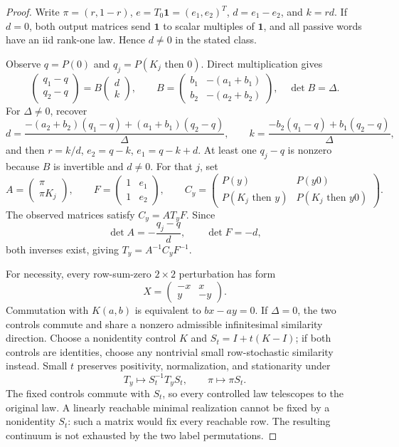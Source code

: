 \documentclass[11pt,letterpaper]{article}
\newcommand{\one}{\mathbf1}
\begin{document}
\begin{proof}
Write $\pi=(r,1-r)$, $e=T_0\one=(e_1,e_2)^T$, $d=e_1-e_2$, and $k=rd$. If $d=0$, both output matrices send $\one$ to scalar multiples of $\one$, and all passive words have an iid rank-one law. Hence $d\ne0$ in the stated class.

Observe $q=P(0)$ and $q_j=P(K_j\text{ then }0)$. Direct multiplication gives
\begin{equation}
 \begin{pmatrix}q_1-q\\q_2-q\end{pmatrix}
 =B\begin{pmatrix}d\\k\end{pmatrix},\qquad
 B=\begin{pmatrix}b_1&-(a_1+b_1)\\b_2&-(a_2+b_2)\end{pmatrix},
 \quad \det B=\Delta. \label{eq:B}
\end{equation}
For $\Delta\ne0$, recover
\[
 d=\frac{-(a_2+b_2)(q_1-q)+(a_1+b_1)(q_2-q)}{\Delta},\qquad
 k=\frac{-b_2(q_1-q)+b_1(q_2-q)}{\Delta},
\]
and then $r=k/d$, $e_2=q-k$, $e_1=q-k+d$. At least one $q_j-q$ is nonzero because $B$ is invertible and $d\ne0$. For that $j$, set
\[
 A=\begin{pmatrix}\pi\\\pi K_j\end{pmatrix},\qquad
 F=\begin{pmatrix}1&e_1\\1&e_2\end{pmatrix},\qquad
 C_y=\begin{pmatrix}P(y)&P(y0)\\P(K_j\text{ then }y)&P(K_j\text{ then }y0)\end{pmatrix}.
\]
The observed matrices satisfy $C_y=AT_yF$. Since
\[
 \det A=-\frac{q_j-q}{d},\qquad\det F=-d,
\]
both inverses exist, giving $T_y=A^{-1}C_yF^{-1}$.

For necessity, every row-sum-zero $2\times2$ perturbation has form
\[
 X=\begin{pmatrix}-x&x\\y&-y\end{pmatrix}.
\]
Commutation with $K(a,b)$ is equivalent to $bx-ay=0$. If $\Delta=0$, the two controls commute and share a nonzero admissible infinitesimal similarity direction. Choose a nonidentity control $K$ and $S_t=I+t(K-I)$; if both controls are identities, choose any nontrivial small row-stochastic similarity instead. Small $t$ preserves positivity, normalization, and stationarity under
\[
 T_y\mapsto S_t^{-1}T_yS_t,\qquad\pi\mapsto\pi S_t.
\]
The fixed controls commute with $S_t$, so every controlled law telescopes to the original law. A linearly reachable minimal realization cannot be fixed by a nonidentity $S_t$: such a matrix would fix every reachable row. The resulting continuum is not exhausted by the two label permutations.
\end{proof}
\end{document}

